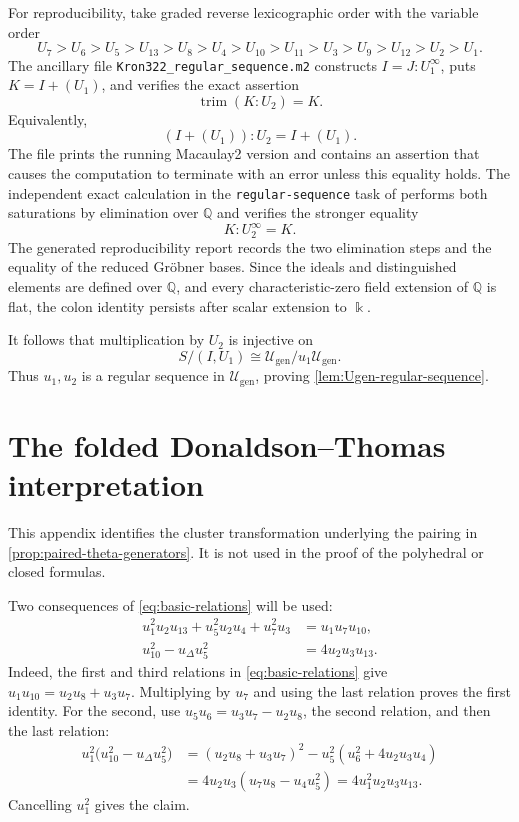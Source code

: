 \documentclass[11pt,reqno]{amsart}
\numberwithin{equation}{section}
\theoremstyle{remark}
\newcommand{\kk}{\Bbbk}
\newcommand{\Ugen}{\mathscr U_{\mathrm{gen}}}
\newcommand{\udisc}{u_{\Delta}}
\begin{document}
For reproducibility, take graded reverse lexicographic order with the variable
order
\[ U_7>U_6>U_5>U_{13}>U_8>U_4>U_{10}>U_{11}> U_3>U_9>U_{12}>U_2>U_1. \]
The ancillary file
\texttt{Kron322\_regular\_sequence.m2} constructs
$I=J:U_1^\infty$, puts $K=I+(U_1)$, and verifies the exact assertion
\[ \operatorname{trim}(K:U_2)=K. \]
Equivalently,
\[ (I+(U_1)):U_2=I+(U_1). \]
The file prints the running Macaulay2 version and contains an assertion that causes the computation to terminate with an error unless this equality holds.  The independent exact calculation in the \texttt{regular-sequence} task of
 performs both saturations by elimination over
$\mathbb Q$ and verifies the stronger equality
\[ K:U_2^\infty=K. \]
The generated reproducibility report records the two elimination steps and
the equality of the reduced Gr\"obner bases.  Since the ideals
and distinguished elements are defined over $\mathbb Q$, and every
characteristic-zero field extension of $\mathbb Q$ is flat, the colon
identity persists after scalar extension to $\kk$.

It follows that multiplication by $U_2$ is injective on
\[ S/(I,U_1)\cong\Ugen/u_1\Ugen. \]
Thus $u_1,u_2$ is a regular sequence in $\Ugen$, proving
\cref{lem:Ugen-regular-sequence}.

\section{The folded Donaldson--Thomas interpretation}
\label{app:folded-DT}

This appendix identifies the cluster transformation underlying the pairing in
\cref{prop:paired-theta-generators}.  It is not used in the proof of the
polyhedral or closed formulas.

Two consequences of \eqref{eq:basic-relations} will be used:
\begin{equation}
\label{eq:DT-two-identities}
 \begin{aligned}
 u_1^2u_2u_{13}+u_5^2u_2u_4+u_7^2u_3
   &=u_1u_7u_{10},\\
 u_{10}^2-\udisc u_5^2&=4u_2u_3u_{13}.
 \end{aligned}
\end{equation}
Indeed, the first and third relations in \eqref{eq:basic-relations} give
$u_1u_{10}=u_2u_8+u_3u_7$.  Multiplying by $u_7$ and using the last
relation proves the first identity.  For the second, use
$u_5u_6=u_3u_7-u_2u_8$, the second relation, and then the last relation:
\[
 \begin{aligned}
 u_1^2\bigl(u_{10}^2-\udisc u_5^2\bigr)
 &=(u_2u_8+u_3u_7)^2-u_5^2(u_6^2+4u_2u_3u_4)\\
 &=4u_2u_3(u_7u_8-u_4u_5^2)
  =4u_1^2u_2u_3u_{13}.
 \end{aligned}
\]
Cancelling $u_1^2$ gives the claim.
\end{document}
